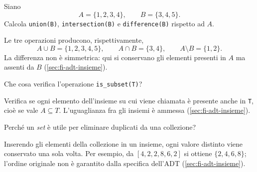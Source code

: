 \begin{exercise}
\label{ex:fi-esercizi-strutture-dati-set-operazioni-insiemistiche}
Siano
\[
  A=\{1,2,3,4\},\qquad B=\{3,4,5\}.
\]
Calcola \texttt{union(B)}, \texttt{intersection(B)} e \texttt{difference(B)}
rispetto ad \(A\).
\end{exercise}

Le tre operazioni producono, rispettivamente,
\[
  A\cup B=\{1,2,3,4,5\},\qquad
  A\cap B=\{3,4\},\qquad
  A\setminus B=\{1,2\}.
\]
La differenza non è simmetrica: qui si conservano gli elementi presenti in \(A\)
ma assenti da \(B\) (\cref{sec:fi-adt-insieme}).

\begin{exercise}
\label{ex:fi-esercizi-strutture-dati-set-sottoinsieme}
Che cosa verifica l'operazione \texttt{is\_subset(T)}?
\end{exercise}

Verifica se ogni elemento dell'insieme su cui viene chiamata è presente anche in
\texttt{T}, cioè se vale \(A\subseteq T\). L'uguaglianza fra gli insiemi è
ammessa (\cref{sec:fi-adt-insieme}).

\begin{exercise}
\label{ex:fi-esercizi-strutture-dati-set-elimina-duplicati}
Perché un \emph{set} è utile per eliminare duplicati da una collezione?
\end{exercise}

Inserendo gli elementi della collezione in un insieme, ogni valore distinto
viene conservato una sola volta. Per esempio, da \([4,2,2,8,6,2]\) si ottiene
\(\{2,4,6,8\}\); l'ordine originale non è garantito dalla specifica dell'ADT
(\cref{sec:fi-adt-insieme}).
